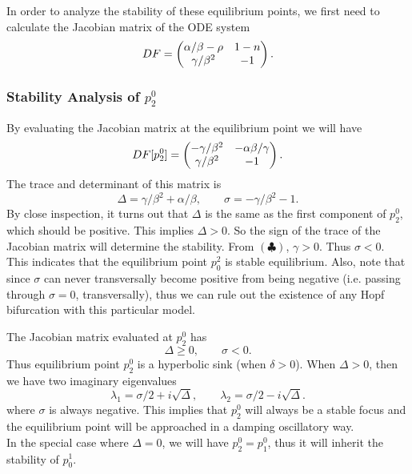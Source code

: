 %	

In order to analyze the stability of these equilibrium points, we first need to calculate the Jacobian matrix of the ODE system 
\[ DF = \begin{pmatrix} \alpha/\beta-\rho & 1-n \\ \gamma/\beta^2 & -1 \end{pmatrix}. \]

\subsubsection{Stability Analysis of $p^0_2$}
By evaluating the Jacobian matrix at the equilibrium point we will have
\[ DF[p^0_2] = \begin{pmatrix} -\gamma/\beta^2 & -\alpha\beta/\gamma \\ \gamma/\beta^2 & -1 \end{pmatrix}. \]
The trace and determinant of this matrix is
\[  \Delta = \gamma/\beta^2 + \alpha/\beta, \qquad \sigma=-\gamma/\beta^2 - 1.  \]
By close inspection, it turns out that $\Delta$ is the same as the first component of $p^0_2$, which should be positive. This implies $\Delta > 0$. So the sign of the trace of the Jacobian matrix will determine the stability. From $(\clubsuit)$, $\gamma>0$. Thus $\sigma < 0$. This indicates that the equilibrium point $p_0^2$ is stable equilibrium. Also, note that since $\sigma$ can never transversally become positive from being negative (i.e. passing through $\sigma=0$, transversally), thus we can rule out the existence of any Hopf bifurcation with this particular model.

\begin{observation}[stability of $p^0_2$]
	The Jacobian matrix evaluated at $p^0_2$ has
	\[ \Delta \geq 0, \qquad \sigma < 0. \]
	Thus equilibrium point $p^0_2$ is a hyperbolic sink (when $\delta > 0$). When $\Delta>0$, then we have two imaginary eigenvalues
	\[ \lambda_1 = \sigma/2+i\sqrt{\Delta}, \qquad \lambda_2 = \sigma/2-i\sqrt{\Delta}. \]
	where $\sigma$ is always negative. This implies that $p^0_2$ will always be a stable focus and the equilibrium point will be approached in a damping oscillatory way.\\
	In the special case where $\Delta =0$, we will have $p^0_2=p^0_1$, thus it will inherit the stability of $p_0^1$. 
\end{observation}

